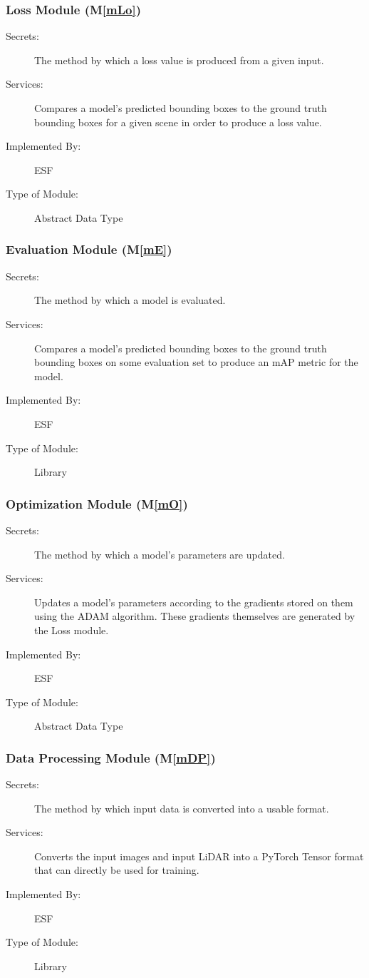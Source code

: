 \documentclass[12pt, titlepage]{article}
\newcommand{\ProjectName}{ESF }
\newcommand{\mref}[1]{M\ref{#1}}
\begin{document}
\subsubsection{Loss Module (\mref{mLo})}
\begin{description}
\item[Secrets:] The method by which a loss value is produced from a given input.
\item[Services:] Compares a model's predicted bounding boxes to the ground truth bounding boxes for a given scene in order to produce a loss value.
\item[Implemented By:] \ProjectName{}
\item[Type of Module:] Abstract Data Type
\end{description}

\subsubsection{Evaluation Module (\mref{mE})}
\begin{description}
\item[Secrets:] The method by which a model is evaluated. 
\item[Services:] Compares a model's predicted bounding boxes to the ground truth bounding boxes on some evaluation set to produce an mAP metric for the model.
\item[Implemented By:] \ProjectName{}
\item[Type of Module:] Library
\end{description}

\subsubsection{Optimization Module (\mref{mO})}
\begin{description}
\item[Secrets:] The method by which a model's parameters are updated.
\item[Services:] Updates a model's parameters according to the gradients stored on them using the ADAM algorithm. These gradients themselves are generated by the Loss module.
\item[Implemented By:] \ProjectName{}
\item[Type of Module:] Abstract Data Type
\end{description}

\subsubsection{Data Processing Module (\mref{mDP})}
\begin{description}
\item[Secrets:] The method by which input data is converted into a usable format.
\item[Services:] Converts the input images and input LiDAR into a PyTorch Tensor format that can directly be used for training.
\item[Implemented By:] \ProjectName{} 
\item[Type of Module:] Library
\end{description}
\end{document}

